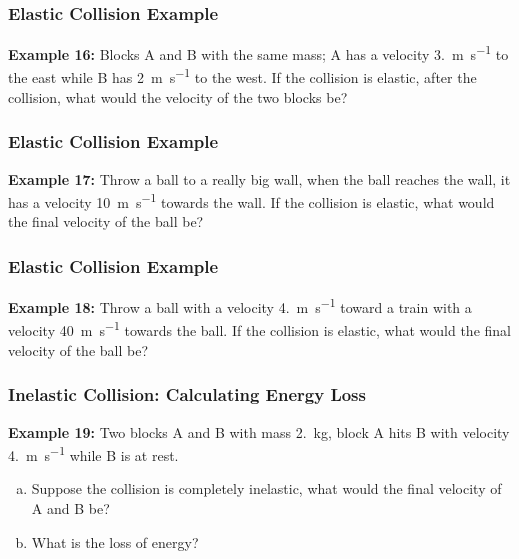 \documentclass[12pt,compress,aspectratio=169]{beamer}
\begin{document}
\begin{frame}
  \frametitle{Elastic Collision Example}
  \textbf{Example 16:} Blocks A and B with the same mass; A has a velocity
  \SI{3.}{\metre\per\second} to the east while B has \SI{2}{\metre\per\second}
  to the west. If the collision is elastic, after the collision, what would the
  velocity of the two blocks be?
\end{frame}


\begin{frame}
  \frametitle{Elastic Collision Example}
  
  \textbf{Example 17:} Throw a ball to a really big wall, when the ball reaches
  the wall, it has a velocity \SI{10}{\metre\per\second} towards the wall. If
  the collision is elastic, what would the final velocity of the ball be?
\end{frame}


\begin{frame}
  \frametitle{Elastic Collision Example}
  \textbf{Example 18:} Throw a ball with a velocity \SI{4.}{\metre\per\second}
  toward a train with a velocity \SI{40}{\metre\per\second} towards the ball.
  If the collision is elastic, what would the final velocity of the ball be?
\end{frame}


\begin{frame}
  \frametitle{Inelastic Collision: Calculating Energy Loss}
  \textbf{Example 19:} Two blocks A and B with mass \SI{2.}{\kilo\gram}, block
  A hits B with velocity \SI{4.}{\metre\per\second} while B is at rest.
  \begin{enumerate}[(a)]
  \item Suppose the collision is completely inelastic, what would the final
    velocity of A and B be?
  \item What is the loss of energy?
  \end{enumerate}
\end{frame}
\end{document}
